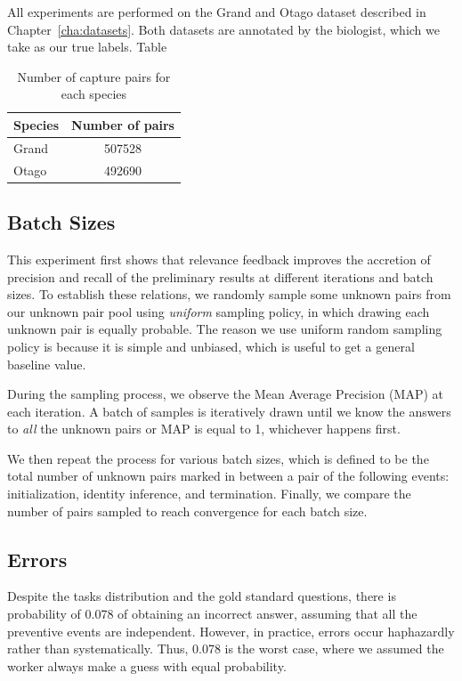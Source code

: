 All experiments are performed on the Grand and Otago dataset described in
Chapter~\ref{cha:datasets}. Both datasets are annotated by the biologist, which
we take as our true labels. Table 

\begin{table}[t]
\captionsetup{justification=centering}
  \caption{Number of capture pairs for each species}
  \label{tab:species_npairs} %
  \centering
  \begin{tabular}{lc}
    \toprule
    Species & Number of pairs \\
    \midrule
    Grand & 507528 \\
    Otago & 492690 \\
    \bottomrule
  \end{tabular}
\end{table}

\subsection{Batch Sizes} %
\label{sub:batch_sizes}

This experiment first shows that relevance feedback improves the accretion of
precision and recall of the preliminary results at different iterations and
batch sizes. To establish these relations, we randomly sample some unknown
pairs from our unknown pair pool using \emph{uniform} sampling policy, in which
drawing each unknown pair is equally probable. The reason we use uniform random
sampling policy is because it is simple and unbiased, which is useful to get a
general baseline value.

During the sampling process, we observe the Mean Average Precision (MAP) at
each iteration. A batch of samples is iteratively drawn until we know the
answers to \emph{all} the unknown pairs or MAP is equal to 1, whichever happens
first.

We then repeat the process for various batch sizes, which is defined to be the
total number of unknown pairs marked in between a pair of the following events:
initialization, identity inference, and termination. Finally, we compare the
number of pairs sampled to reach convergence for each batch size.

\subsection{Errors} %
\label{sub:errors}

Despite the tasks distribution and the gold standard questions, there is
probability of 0.078 of obtaining an incorrect answer, assuming that all the
preventive events are independent. However, in practice, errors occur
haphazardly rather than systematically. Thus, 0.078 is the worst case, where we
assumed the worker always make a guess with equal probability.

